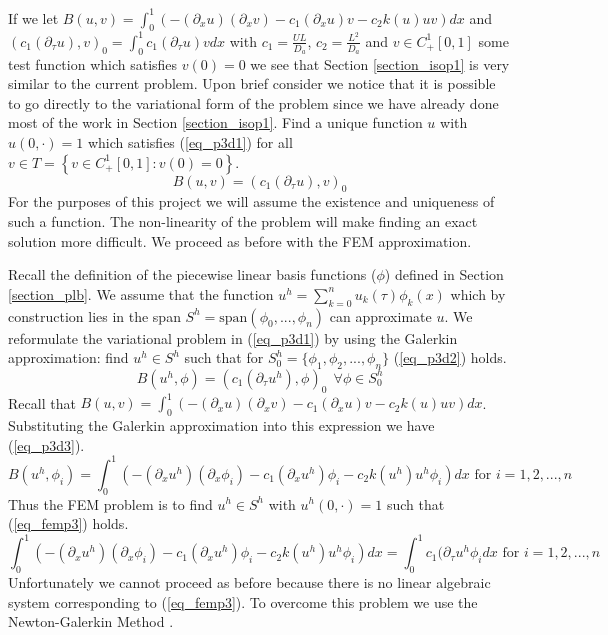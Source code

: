 \documentclass[11pt,fleqn]{article}
\theoremstyle{defstyle}
\begin{document}
If we let $B(u, v) = \int_0^1 \left(-(\partial_xu)(\partial_xv) - c_1(\partial_xu)v - c_2k(u)uv\right)dx$ and $(c_1(\partial_{\tau}u),v)_0 = \int^1_0 c_1(\partial_{\tau}u)v dx$ with $c_1 = \frac{UL}{D_a}$, $c_2 = \frac{L^2}{D_a}$ and $v \in C^1_+[0,1]$ some test function which satisfies $v(0) = 0$ we see that Section \ref{section_isop1} is very similar to the current problem. Upon brief consider we notice that it is possible to go directly to the variational form of the problem since we have already done most of the work in Section \ref{section_isop1}.  Find a unique function $u$ with $u(0, \cdot)=1$ which satisfies (\ref{eq_p3d1}) for all $v \in T=\left\{v \in C^1_+[0, 1] : v(0)=0 \right\}$.
\begin{equation}
B(u, v) = (c_1(\partial_{\tau}u),v)_0
\label{eq_p3d1}
\end{equation}
For the purposes of this project we will assume the existence and uniqueness of such a function. The non-linearity of the problem will make finding an exact solution more difficult. We proceed as before with the FEM approximation.

Recall the definition of the piecewise linear basis functions ($\phi$) defined in Section \ref{section_plb}. We assume that the function $u^h =\sum^n_{k=0} u_k(\tau) \phi_k(x)$ which by construction lies in the span $S^h=\text{span}(\phi_0,...,\phi_n)$ can approximate $u$. We reformulate the variational problem in (\ref{eq_p3d1}) by using the Galerkin approximation: find $u^h \in S^h$ such that for $S^h_0=\{\phi_1, \phi_2,...,\phi_n \}$ (\ref{eq_p3d2}) holds.
\begin{equation}
B(u^h, \phi) = (c_1(\partial_{\tau}u^h),\phi)_0~~\forall \phi \in S^h_0
\label{eq_p3d2}
\end{equation} 
Recall that $B(u, v) = \int_0^1 \left(-(\partial_xu)(\partial_xv) - c_1(\partial_xu)v - c_2k(u)uv\right)dx$. Substituting the Galerkin approximation into this expression we have (\ref{eq_p3d3}).
\begin{equation}
B(u^h, \phi_i) = \int_0^1 \left(-(\partial_xu^h)(\partial_x\phi_i) - c_1(\partial_xu^h)\phi_i - c_2k(u^h)u^h\phi_i\right)dx \text{ for } i=1,2,...,n
\label{eq_p3d3}
\end{equation}
Thus the FEM problem is to find $u^h \in S^h$ with $u^h(0,\cdot)=1$ such that (\ref{eq_femp3}) holds.
\begin{equation}
\int_0^1 \left(-(\partial_xu^h)(\partial_x\phi_i) -c_1(\partial_xu^h)\phi_i - c_2k(u^h)u^h\phi_i\right)dx = \int_0^1 c_1(\partial_{\tau}u^h\phi_i dx \text{ for } i=1,2,...,n
\label{eq_femp3}
\end{equation}
Unfortunately we cannot proceed as before because there is no linear algebraic system corresponding to (\ref{eq_femp3}). To overcome this problem we use the Newton-Galerkin Method \cite{larson}.
\end{document}
